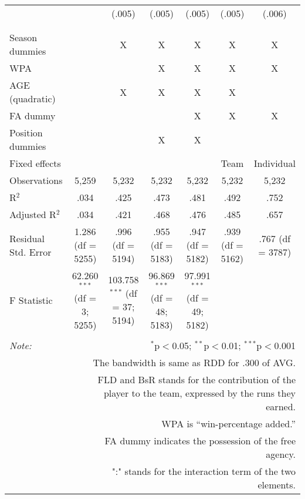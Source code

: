 \begin{table}[H]
\begin{tabular}{@{\extracolsep{-15pt}}lcccccc}
  &  & (.005) & (.005) & (.005) & (.005) & (.006) \\
  & & & & & & \\
\hline \\[-1.8ex]
Season dummies &  & X & X & X & X & X \\
WPA &  &  & X & X & X & X \\
AGE (quadratic) &  & X & X & X & X &  \\
FA dummy &  &  &  & X & X & X \\
Position dummies &  &  & X & X &  &  \\
Fixed effects &  &  &  &  & Team & Individual \\
Observations & 5,259 & 5,232 & 5,232 & 5,232 & 5,232 & 5,232 \\
R$^{2}$ & .034 & .425 & .473 & .481 & .492 & .752 \\
Adjusted R$^{2}$ & .034 & .421 & .468 & .476 & .485 & .657 \\
Residual Std. Error & 1.286 (df = 5255) & .996 (df = 5194) & .955 (df = 5183) & .947 (df = 5182) & .939 (df = 5162) & .767 (df = 3787) \\
F Statistic & 62.260$^{***}$ (df = 3; 5255) & 103.758$^{***}$ (df = 37; 5194) & 96.869$^{***}$ (df = 48; 5183) & 97.991$^{***}$ (df = 49; 5182) &  &  \\
\hline
\hline \\[-1.8ex]
\textit{Note:}  & \multicolumn{6}{r}{$^{*}$p$<$0.05; $^{**}$p$<$0.01; $^{***}$p$<$0.001} \\
& \multicolumn{6}{r}{The bandwidth is same as RDD for .300 of AVG.} \\
& \multicolumn{6}{r}{FLD and BsR stands for the contribution of the player to the team, expressed by the runs they earned.} \\
& \multicolumn{6}{r}{WPA is ``win-percentage added.''} \\
& \multicolumn{6}{r}{FA dummy indicates the possession of the free agency.}\\
& \multicolumn{6}{r}{":" stands for the interaction term of the two elements.} \\
\end{tabular}
\end{table}
